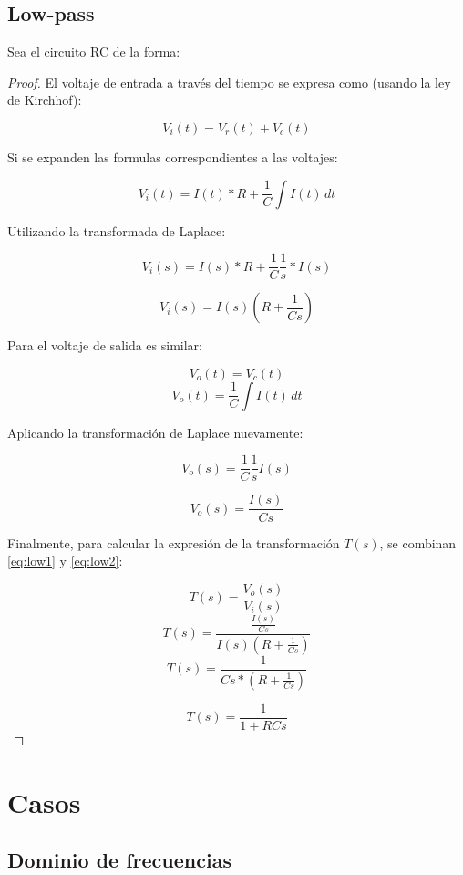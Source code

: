 \documentclass{article}[12pt,a4paper]
\begin{document}
\subsection{Low-pass}
Sea el circuito RC de la forma:

\begin{proof}

  El voltaje de entrada a través del tiempo se expresa como (usando la ley de Kirchhof):

  $$V_{i}(t)=V_{r}(t)+V_{c}(t)$$

  Si se expanden las formulas correspondientes a las voltajes:

  $$V_{i}(t)=I(t)*R+\frac{1}{C}\int I(t)\,dt$$

  Utilizando la transformada de Laplace:

  $$V_{i}(s)=I(s)*R+\frac{1}{C}\frac{1}{s}*I(s)$$

  \begin{equation}
    V_{i}(s)=I(s)\left(R+\frac{1}{Cs}\right)
    \label{eq:low1}
  \end{equation}

  Para el voltaje de salida es similar:

  $$V_{o}(t)=V_{c}(t)$$
  $$V_{o}(t)=\frac{1}{C}\int I(t)\,dt$$

  Aplicando la transformación de Laplace nuevamente:

  $$V_{o}(s)=\frac{1}{C}\frac{1}{s}I(s)$$

  \begin{equation}
    V_{o}(s)=\frac{I(s)}{Cs}
    \label{eq:low2}
  \end{equation}

  Finalmente, para calcular la expresión de la transformación \(T(s)\), se combinan \ref{eq:low1} y \ref{eq:low2}:

  $$T(s)=\frac{V_{o}(s)}{V_{i}(s)}$$
  $$T(s)=\frac{\frac{I(s)}{Cs}}{I(s)\left(R+\frac{1}{Cs}\right)}$$
  $$T(s)=\frac{1}{Cs*\left(R+\frac{1}{Cs}\right)}$$

  \begin{equation}
    T(s)=\frac{1}{1+RCs}
    \label{eq:rlow}
  \end{equation}
\end{proof}

\section{Casos}

\subsection{Dominio de frecuencias}
\end{document}
